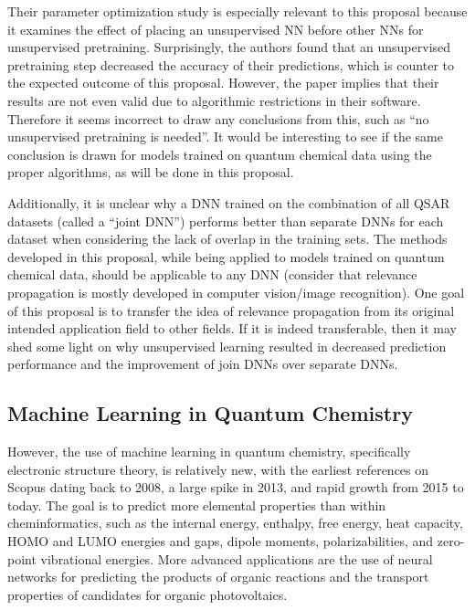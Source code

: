 \documentclass[12pt]{article}
\begin{document}
Their parameter optimization study is especially relevant to this proposal because it examines the effect of placing an unsupervised NN before other NNs for unsupervised pretraining. Surprisingly, the authors found that an unsupervised pretraining step decreased the accuracy of their predictions, which is counter to the expected outcome of this proposal. However, the paper implies that their results are not even valid due to algorithmic restrictions in their software. Therefore it seems incorrect to draw any conclusions from this, such as ``no unsupervised pretraining is needed''. It would be interesting to see if the same conclusion is drawn for models trained on quantum chemical data using the proper algorithms, as will be done in this proposal.

Additionally, it is unclear why a DNN trained on the combination of all QSAR datasets (called a ``joint DNN'') performs better than separate DNNs for each dataset when considering the lack of overlap in the training sets. The methods developed in this proposal, while being applied to models trained on quantum chemical data, should be applicable to any DNN (consider that relevance propagation is mostly developed in computer vision/image recognition). One goal of this proposal is to transfer the idea of relevance propagation from its original intended application field to other fields. If it is indeed transferable, then it may shed some light on why unsupervised learning resulted in decreased prediction performance and the improvement of join DNNs over separate DNNs.

\subsection{Machine Learning in Quantum Chemistry}
\label{sec:org471ab51}

However, the use of machine learning in quantum chemistry, specifically electronic structure theory, is relatively new, with the earliest references on Scopus dating back to 2008, a large spike in 2013, and rapid growth from 2015 to today. The goal is to predict more elemental properties than within cheminformatics, such as the internal energy, enthalpy, free energy, heat capacity, HOMO and LUMO energies and gaps, dipole moments, polarizabilities, and zero-point vibrational energies\cite{2015arXiv150204563R}. More advanced applications are the use of neural networks for predicting the products of organic reactions\cite{doi:10.1021/acscentsci.6b00219} and the transport properties of candidates for organic photovoltaics\cite{C5SC04786B}.
\end{document}
